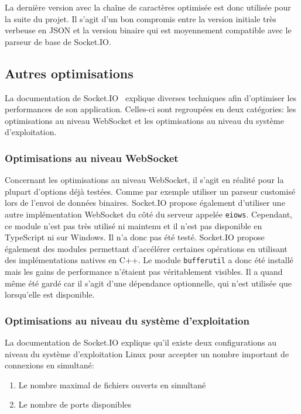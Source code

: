 La dernière version avec la chaîne de caractères optimisée est donc utilisée pour la suite du projet. Il s'agit d'un bon compromis entre la version initiale très verbeuse en JSON et la version binaire qui est moyennement compatible avec le parseur de base de Socket.IO.

\subsection{Autres optimisations}

La documentation de Socket.IO~\cite{socket-io-performance-tuning} explique diverses techniques afin d'optimiser les performances de son application. Celles-ci sont regroupées en deux catégories: les optimisations au niveau WebSocket et les optimisations au niveau du système d'exploitation.

\subsubsection{Optimisations au niveau WebSocket}

Concernant les optimisations au niveau WebSocket, il s'agit en réalité pour la plupart d'options déjà testées. Comme par exemple utiliser un parseur customisé lors de l'envoi de données binaires. Socket.IO propose également d'utiliser une autre implémentation WebSocket du côté du serveur appelée \texttt{eiows}. Cependant, ce module n'est pas très utilisé ni maintenu et il n'est pas disponible en TypeScript ni sur Windows. Il n'a donc pas été testé. Socket.IO propose également des modules permettant d'accélérer certaines opérations en utilisant des implémentations natives en C++. Le module \texttt{bufferutil} a donc été installé mais les gains de performance n'étaient pas véritablement visibles. Il a quand même été gardé car il s'agit d'une dépendance optionnelle, qui n'est utilisée que lorsqu'elle est disponible.

\subsubsection{Optimisations au niveau du système d'exploitation}

La documentation de Socket.IO explique qu'il existe deux configurations au niveau du système d'exploitation Linux pour accepter un nombre important de connexions en simultané:

\begin{enumerate}
  \item Le nombre maximal de fichiers ouverts en simultané
  \item Le nombre de ports disponibles
\end{enumerate}

